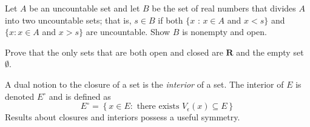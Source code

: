 \begin{exercise}
\end{exercise}

\begin{solution}
  \enum{
  \item \TODO
  \item \TODO
  }
\end{solution}

\begin{exercise}
  Let $A$ be an uncountable set and let $B$ be the set of real numbers that divides $A$ into two uncountable sets; that is, $s \in B$ if both $\{x$ : $x \in A$ and $x<s\}$ and $\{x: x \in A$ and $x>s\}$ are uncountable. Show $B$ is nonempty and open.
\end{exercise}

\begin{solution}
  \TODO
\end{solution}

\begin{exercise}
  Prove that the only sets that are both open and closed are $\mathbf{R}$ and the empty set $\emptyset$.
\end{exercise}

\begin{solution}
  \TODO
\end{solution}

\begin{exercise}
  A dual notion to the closure of a set is the \emph{interior} of a set. The interior of $E$ is denoted $E^{\circ}$ and is defined as
  $$
  E^{\circ}=\left\{x \in E: \text { there exists } V_{\epsilon}(x) \subseteq E\right\}
  $$
  Results about closures and interiors possess a useful symmetry.
\end{exercise}

\begin{solution}
  \enum{
  \item \TODO
  \item \TODO
  }
\end{solution}

